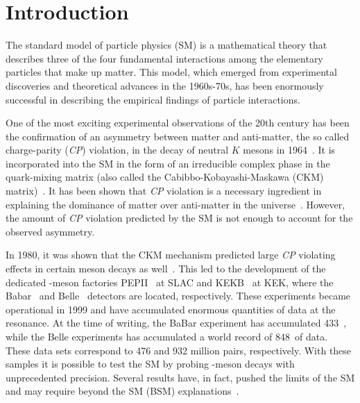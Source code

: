 \chapter{\label{introduction}Introduction}
The standard model of particle physics (SM) is a mathematical theory that describes three of the four fundamental interactions among the elementary particles that make up matter. This model, which emerged from experimental discoveries and theoretical advances in the 1960s-70s, has been enormously successful in describing the empirical findings of particle interactions. 

One of the most exciting experimental observations of the 20th century has been the confirmation of an asymmetry between matter and anti-matter, the so called charge-parity (\textit{CP}) violation, in the decay of neutral $K$ mesons in 1964~\cite{CPV_kaon}. It is incorporated into the SM in the form of an irreducible complex phase in the quark-mixing matrix (also called the Cabibbo-Kobayashi-Maskawa (CKM) matrix)~\cite{ckm}. It has been shown that \textit{CP} violation is a necessary ingredient in explaining the dominance of matter over anti-matter in the universe~\cite{CPV_m_am}. However, the amount of \textit{CP} violation predicted by the SM is not enough to account for the observed asymmetry. 

In 1980, it was shown that the CKM mechanism predicted large \textit{CP} violating effects in certain \B meson decays as well~\cite{CPV_B1,CPV_B2}. This led to the development of the dedicated \B-meson factories PEPII~\cite{PEPII} at SLAC and KEKB~\cite{kekb} at KEK, where the Babar~\cite{babar_detector} and Belle~\cite{belle_detector} detectors are located, respectively. These experiments became operational in 1999 and have accumulated enormous quantities of data at the \upsFour resonance. At the time of writing, the BaBar experiment has accumulated 433~\invfb, while the Belle experiments has accumulated a world record of 848~\invfb of data. These data sets correspond to 476 and 932 million \BBbar pairs, respectively. With these samples it is possible to test the SM by probing \B-meson decays with unprecedented precision. Several results have, in fact, pushed the limits of the SM and may require beyond the SM (BSM) explanations~\cite{kpiDCPV_babar, kpiDCPV_belle}. 


